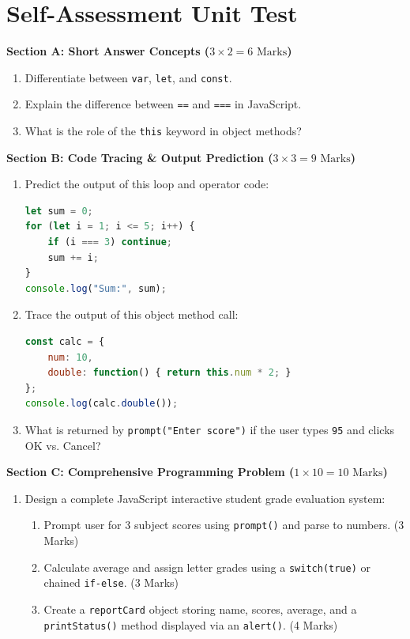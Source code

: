 \section{Self-Assessment Unit Test}

\begin{chaptertest}
\noindent\textbf{Section A: Short Answer Concepts ($3 \times 2 = 6\text{ Marks}$)}
\begin{enumerate}
    \item Differentiate between \texttt{var}, \texttt{let}, and \texttt{const}.
    \item Explain the difference between \texttt{==} and \texttt{===} in JavaScript.
    \item What is the role of the \texttt{this} keyword in object methods?
\end{enumerate}

\medskip
\noindent\textbf{Section B: Code Tracing \& Output Prediction ($3 \times 3 = 9\text{ Marks}$)}
\begin{enumerate}[start=4]
    \item Predict the output of this loop and operator code:
    \begin{lstlisting}[language=JavaScript]
let sum = 0;
for (let i = 1; i <= 5; i++) {
    if (i === 3) continue;
    sum += i;
}
console.log("Sum:", sum);
    \end{lstlisting}
    \item Trace the output of this object method call:
    \begin{lstlisting}[language=JavaScript]
const calc = {
    num: 10,
    double: function() { return this.num * 2; }
};
console.log(calc.double());
    \end{lstlisting}
    \item What is returned by \texttt{prompt("Enter score")} if the user types \texttt{95} and clicks OK vs. Cancel?
\end{enumerate}

\medskip
\noindent\textbf{Section C: Comprehensive Programming Problem ($1 \times 10 = 10\text{ Marks}$)}
\begin{enumerate}[start=7]
    \item Design a complete JavaScript interactive student grade evaluation system:
    \begin{enumerate}[label=(\alph*)]
        \item Prompt user for 3 subject scores using \texttt{prompt()} and parse to numbers. (3 Marks)
        \item Calculate average and assign letter grades using a \texttt{switch(true)} or chained \texttt{if-else}. (3 Marks)
        \item Create a \texttt{reportCard} object storing name, scores, average, and a \texttt{printStatus()} method displayed via an \texttt{alert()}. (4 Marks)
    \end{enumerate}
\end{enumerate}
\end{chaptertest}

